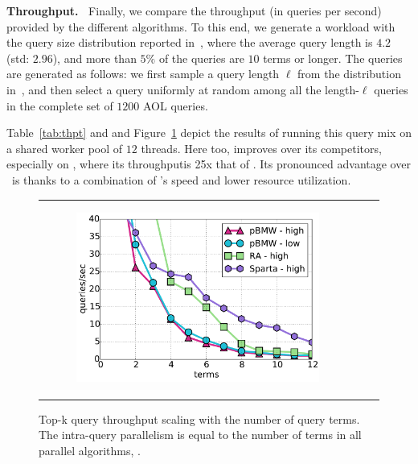 {{{\bf Throughput.\ } Finally, we compare the throughput (in queries per second) provided by the different
algorithms. To this end, we generate a workload with the query size distribution reported in~\cite{sigir/Guy16},
where the average query length is $4.2$ (std: $2.96$), and more than $5\%$ of the queries are $10$ terms or longer.
The queries are generated as follows: we first sample a query length $\ell$ from the distribution in~\cite{sigir/Guy16}, and then 
select a query uniformly at random among all the length-$\ell$ queries in the complete set of  $1200$ AOL queries. 

Table~\ref{tab:thpt} and and Figure~\ref{fig:throughput-scaling} depict the results of running this query mix on a shared worker pool  of $12$ threads.
Here too, \alg\/ improves over its competitors, especially on \cwten, where its throughputis 25x that of \pBMW\hi. 
Its pronounced advantage over \pBMW\ is thanks to a combination of \alg's speed and lower resource utilization.


\begin{figure}[tbh]
\centering
\begin{tabular}{ccc}
      \begin{subfigure}[t]{0.3\textwidth}
         \includegraphics[width=\textwidth]{figures/throughput_12threads_clueweb.pdf}
      \end{subfigure}      
\end{tabular}
\caption{Top-k query throughput scaling with the number of query terms. The intra-query parallelism 
is equal to the number of terms in all parallel algorithms, \cw.}
\label{fig:throughput-scaling}
\end{figure}



}}

